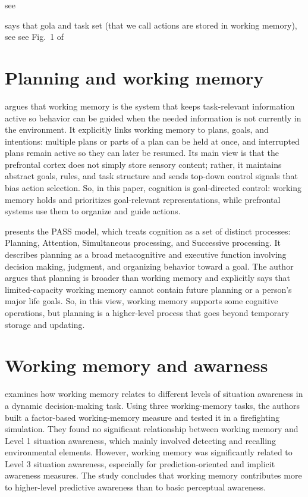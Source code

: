 \documentclass[a4paper]{article}
\begin{document}
        
        see \cite{cowan-2017-the-many-faces-of-working-memory}
        
        \cite{eriksson-2015-neurocognitive-architecture-of-working-memory} says that gola and task set (that we call actions are stored in working memory), see see Fig.~1 of \cite{eriksson-2015-neurocognitive-architecture-of-working-memory}
    
    
    \section{Planning and working memory}
        
        \cite{desposito-2015-the-cognitive-neuroscience-of-working-memory} argues that working memory is the system that keeps task-relevant information active so behavior can be guided when the needed information is not currently in the environment. It explicitly links working memory to plans, goals, and intentions: multiple plans or parts of a plan can be held at once, and interrupted plans remain active so they can later be resumed. Its main view is that the prefrontal cortex does not simply store sensory content; rather, it maintains abstract goals, rules, and task structure and sends top-down control signals that bias action selection. So, in this paper, cognition is goal-directed control: working memory holds and prioritizes goal-relevant representations, while prefrontal systems use them to organize and guide actions.
        
        \cite{das-2015-three-faces-of-cognitive-processes-theory-assessment-and-intervention}  presents the PASS model, which treats cognition as a set of distinct processes: Planning, Attention, Simultaneous processing, and Successive processing. It describes planning as a broad metacognitive and executive function involving decision making, judgment, and organizing behavior toward a goal. The author argues that planning is broader than working memory and explicitly says that limited-capacity working memory cannot contain future planning or a person’s major life goals.
        So, in this view, working memory supports some cognitive operations, but planning is a higher-level process that goes beyond temporary storage and updating.
    
    
    \section{Working memory and awarness}
        \cite{gutzwiller-2013-the-role-of-working-memory-in-levels-of-situation-awareness} examines how working memory relates to different levels of situation awareness in a dynamic decision-making task. Using three working-memory tasks, the authors built a factor-based working-memory measure and tested it in a firefighting simulation. They found no significant relationship between working memory and Level 1 situation awareness, which mainly involved detecting and recalling environmental elements. However, working memory was significantly related to Level 3 situation awareness, especially for prediction-oriented and implicit awareness measures. The study concludes that working memory contributes more to higher-level predictive awareness than to basic perceptual awareness.
    
\end{document}
